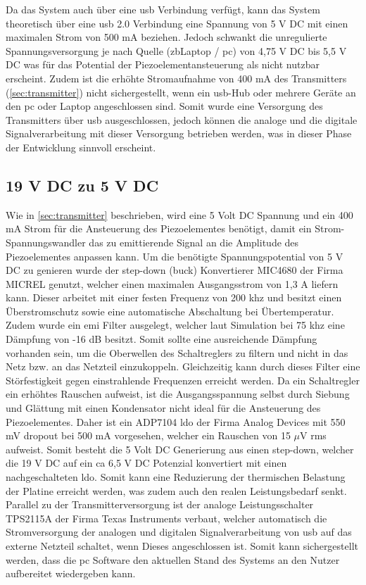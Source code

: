 Da das System auch über eine \ac{usb} Verbindung verfügt, kann das System theoretisch über eine \ac{usb} 2.0 Verbindung eine Spannung von 5 V DC mit einen maximalen Strom von 500 mA beziehen. Jedoch schwankt die unregulierte Spannungsversorgung je nach Quelle (\ac{zb}Laptop / \ac{pc}) von 4,75 V DC bis 5,5 V DC was für das Potential der Piezoelementansteuerung als nicht nutzbar erscheint. Zudem ist die erhöhte Stromaufnahme von 400 mA des Transmitters (\autoref{sec:transmitter}) nicht sichergestellt, wenn ein \ac{usb}-Hub oder mehrere Geräte an den \ac{pc} oder Laptop angeschlossen sind. Somit wurde eine Versorgung des Transmitters über \ac{usb} ausgeschlossen, jedoch können die analoge und die digitale Signalverarbeitung mit dieser Versorgung betrieben werden, was in dieser Phase der Entwicklung sinnvoll erscheint.
\subsection*{19 V DC zu 5 V DC}
Wie in \autoref{sec:transmitter} beschrieben, wird eine 5 Volt DC Spannung und ein 400 mA Strom für die Ansteuerung des Piezoelementes benötigt, damit ein Strom-Spannungswandler das zu emittierende Signal an die Amplitude des Piezoelementes anpassen kann. Um die benötigte Spannungspotential von 5 V DC zu genieren wurde der step-down (buck) Konvertierer MIC4680 der Firma MICREL genutzt, welcher einen maximalen Ausgangsstrom von 1,3 A liefern kann. Dieser arbeitet mit einer festen Frequenz von 200 \ac{khz} und besitzt einen Überstromschutz sowie eine automatische Abschaltung bei Übertemperatur.\\
Zudem wurde ein \ac{emi} Filter ausgelegt, welcher laut Simulation bei 75 \ac{khz} eine Dämpfung von -16 dB besitzt. Somit sollte eine ausreichende Dämpfung vorhanden sein, um die Oberwellen des Schaltreglers zu filtern und nicht in das Netz bzw. an das Netzteil einzukoppeln. Gleichzeitig kann durch dieses Filter eine Störfestigkeit gegen einstrahlende Frequenzen erreicht werden. %
Da ein Schaltregler ein erhöhtes Rauschen aufweist, ist die Ausgangsspannung selbst durch Siebung und Glättung mit einen Kondensator nicht ideal für die Ansteuerung des Piezoelementes. Daher ist ein ADP7104 \ac{ldo} der Firma Analog Devices mit 550 mV dropout bei 500 mA vorgesehen, welcher ein Rauschen von 15 $\mu$V rms aufweist. Somit besteht die 5 Volt DC Generierung aus einen step-down, welcher die 19 V DC auf ein \ac{ca} 6,5 V DC Potenzial konvertiert mit einen nachgeschalteten \ac{ldo}. Somit kann eine Reduzierung der thermischen Belastung der Platine erreicht werden, was zudem auch den realen Leistungsbedarf senkt.\\
Parallel zu der Transmitterversorgung ist der analoge Leistungsschalter TPS2115A der Firma Texas Instruments verbaut, welcher automatisch die Stromversorgung der analogen und digitalen Signalverarbeitung von \ac{usb} auf das externe Netzteil schaltet, wenn Dieses angeschlossen ist. Somit kann sichergestellt werden, dass die \ac{pc} Software den aktuellen Stand des Systems an den Nutzer aufbereitet wiedergeben kann.
